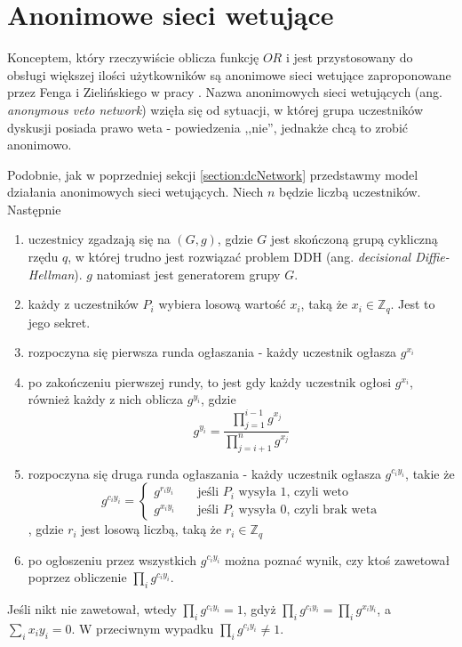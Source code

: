 \documentclass[a4paper]{article}
\begin{document}
\section{Anonimowe sieci wetujące} \label{section:avNetwork}
Konceptem, który rzeczywiście oblicza funkcję $OR$ i jest przystosowany do obsługi większej ilości użytkowników są anonimowe sieci wetujące zaproponowane przez Fenga i Zielińskiego w pracy \cite{avNetwork}. Nazwa anonimowych sieci wetujących (ang. \textit{anonymous veto network}) wzięła się od sytuacji, w której grupa uczestników dyskusji posiada prawo weta - powiedzenia ,,nie'', jednakże chcą to zrobić anonimowo.

Podobnie, jak w poprzedniej sekcji \ref{section:dcNetwork} przedstawmy model działania anonimowych sieci wetujących. Niech $n$ będzie liczbą uczestników. Następnie 
\begin{enumerate}
    \item uczestnicy zgadzają się na $(G, g)$, gdzie $G$ jest skończoną grupą cykliczną rzędu $q$, w której trudno jest rozwiązać problem DDH (ang. \textit{decisional Diffie-Hellman}). $g$ natomiast jest generatorem grupy $G$. 
    \item każdy z uczestników $P_i$ wybiera losową wartość $x_i$, taką że $x_i \in \mathbb{Z}_q$. Jest to jego sekret.
    \item rozpoczyna się pierwsza runda ogłaszania - każdy uczestnik ogłasza $g^{x_i}$
    \item po zakończeniu pierwszej rundy, to jest gdy każdy uczestnik ogłosi $g^{x_i}$, również każdy z nich oblicza $g^{y_i}$, gdzie
    \begin{equation}
        g^{y_i} = \frac{\prod_{j=1}^{i-1}g^{x_j}}{\prod_{j=i+1}^n g^{x_j}}  
    \end{equation}
    \item rozpoczyna się druga runda ogłaszania - każdy uczestnik ogłasza $g^{c_i y_i}$, takie że 
    \begin{equation}
        g^{c_i y_i} = 
        \begin{cases}
            g^{r_i y_i} & \quad \text{jeśli $P_i$ wysyła $1$, czyli weto}\\
            g^{x_i y_i} & \quad \text{jeśli $P_i$ wysyła $0$, czyli brak weta}
        \end{cases}
    \end{equation}
    , gdzie $r_i$ jest losową liczbą, taką że $r_i \in \mathbb{Z}_q$
    \item po ogłoszeniu przez wszystkich $g^{c_i y_i}$ można poznać wynik, czy ktoś zawetował poprzez obliczenie $\prod_i g^{c_i y_i}$.
\end{enumerate}
Jeśli nikt nie zawetował, wtedy $\prod_i g^{c_i y_i} = 1$, gdyż $\prod_i g^{c_i y_i} = \prod_i g^{x_i y_i}$, a $\sum_i x_iy_i = 0$. W przeciwnym wypadku $\prod_i g^{c_i y_i} \neq 1$. 
\end{document}
